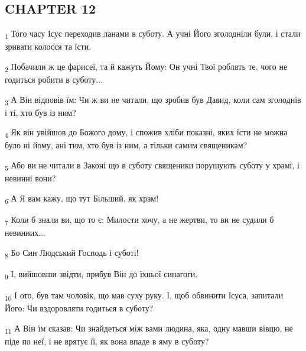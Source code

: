 \subsection{CHAPTER 12}
\begin{tcolorbox}
\textsubscript{1} Того часу Ісус переходив ланами в суботу. А учні Його зголодніли були, і стали зривати колосся та їсти.
\end{tcolorbox}
\begin{tcolorbox}
\textsubscript{2} Побачили ж це фарисеї, та й кажуть Йому: Он учні Твої роблять те, чого не годиться робити в суботу...
\end{tcolorbox}
\begin{tcolorbox}
\textsubscript{3} А Він відповів їм: Чи ж ви не читали, що зробив був Давид, коли сам зголоднів і ті, хто був із ним?
\end{tcolorbox}
\begin{tcolorbox}
\textsubscript{4} Як він увійшов до Божого дому, і спожив хліби показні, яких їсти не можна було ні йому, ані тим, хто був із ним, а тільки самим священикам?
\end{tcolorbox}
\begin{tcolorbox}
\textsubscript{5} Або ви не читали в Законі що в суботу священики порушують суботу у храмі, і невинні вони?
\end{tcolorbox}
\begin{tcolorbox}
\textsubscript{6} А Я вам кажу, що тут Більший, як храм!
\end{tcolorbox}
\begin{tcolorbox}
\textsubscript{7} Коли б знали ви, що то є: Милости хочу, а не жертви, то ви не судили б невинних...
\end{tcolorbox}
\begin{tcolorbox}
\textsubscript{8} Бо Син Людський Господь і суботі!
\end{tcolorbox}
\begin{tcolorbox}
\textsubscript{9} І, вийшовши звідти, прибув Він до їхньої синагоги.
\end{tcolorbox}
\begin{tcolorbox}
\textsubscript{10} І ото, був там чоловік, що мав суху руку. І, щоб обвинити Ісуса, запитали Його: Чи вздоровляти годиться в суботу?
\end{tcolorbox}
\begin{tcolorbox}
\textsubscript{11} А Він їм сказав: Чи знайдеться між вами людина, яка, одну мавши вівцю, не піде по неї, і не врятує її, як вона впаде в яму в суботу?
\end{tcolorbox}
